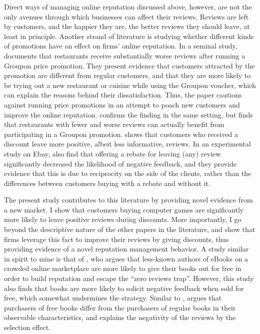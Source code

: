 \documentclass[
  12pt,
  pagebackref]{article}
\begin{document}
Direct ways of managing online reputation discussed above, however, are
not the only avenues through which businesses can affect their reviews.
Reviews are left by customers, and the happier they are, the better
reviews they should leave, at least in principle. Another strand of
literature is studying whether different kinds of promotions have an
effect on firms' online reputation. In a seminal study,
\citet{ByersEtAl12} documents that restaurants receive substantially
worse reviews after running a Groupon price promotion. They present
evidence that customers attracted by the promotion are different from
regular customers, and that they are more likely to be trying out a new
restaurant or cuisine while using the Groupon voucher, which can explain
the reasons behind their dissatisfaction. Thus, the paper cautions
against running price promotions in an attempt to poach new customers
and improve the online reputation. \citet{Li16} confirms the finding in
the same setting, but finds that restaurants with fewer and worse
reviews can actually benefit from participating in a Groupon promotion.
\citet{ZhuEtAl19} shows that customers who received a discount leave
more positive, albeit less informative, reviews. In an experimental
study on Ebay, \citet{CabralLi15} also find that offering a rebate for
leaving (any) review significantly decreased the likelihood of negative
feedback, and they provide evidence that this is due to reciprocity on
the side of the clients, rather than the differences between customers
buying with a rebate and without it.

The present study contributes to this literature by providing novel
evidence from a new market. I show that customers buying computer games
are significantly more likely to leave positive reviews during
discounts. More importantly, I go beyond the descriptive nature of the
other papers in the literature, and show that firms leverage this fact
to improve their reviews by giving discounts, thus providing evidence of
a novel reputation management behavior. A study similar in spirit to
mine is that of \citet{Zegners17}, who argues that less-known authors of
eBooks on a crowded online marketplace are more likely to give their
books out for free in order to build reputation and escape the ``zero
reviews trap''. However, this study also finds that books are more
likely to solicit negative feedback when sold for free, which somewhat
undermines the strategy. Similar to \citet{ByersEtAl12},
\citet{Zegners17} argues that purchasers of free books differ from the
purchasers of regular books in their observable characteristics, and
explains the negativity of the reviews by the selection effect.
\end{document}
